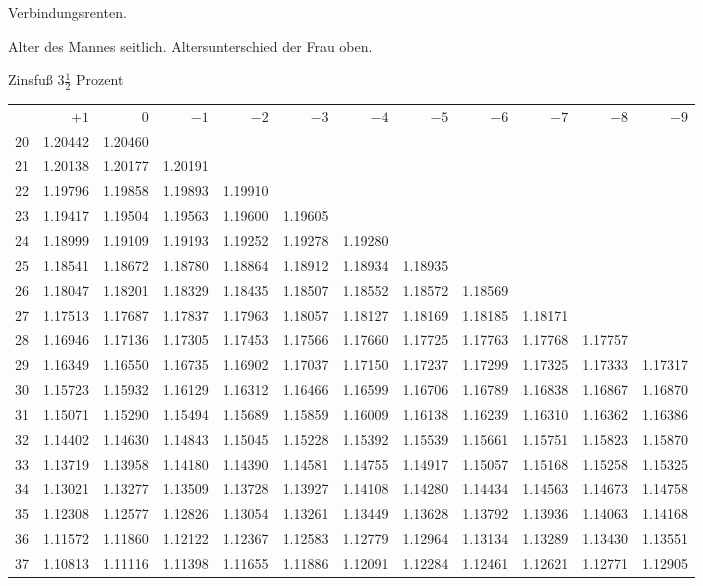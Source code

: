 \clearpage
{}
\begin{center}
Verbindungsrenten.\par\smallskip
Alter des Mannes seitlich. Altersunterschied der Frau oben.\par\smallskip
Zinsfuß \(3\tfrac{1}{2}\) Prozent\par\medskip
\fontsize{8}{10}\selectfont\setlength{\tabcolsep}{1.3pt}
\begin{tabular}{|r|rrrrrrrrrrr|}
\hline
&\(+1\)&0&\(-1\)&\(-2\)&\(-3\)&\(-4\)&\(-5\)&\(-6\)&\(-7\)&\(-8\)&\(-9\)\\[8pt]
20&1.20442&1.20460&&&&&&&&&\\
21&1.20138&1.20177&1.20191&&&&&&&&\\
22&1.19796&1.19858&1.19893&1.19910&&&&&&&\\
23&1.19417&1.19504&1.19563&1.19600&1.19605&&&&&&\\
24&1.18999&1.19109&1.19193&1.19252&1.19278&1.19280&&&&&\\[5pt]
25&1.18541&1.18672&1.18780&1.18864&1.18912&1.18934&1.18935&&&&\\
26&1.18047&1.18201&1.18329&1.18435&1.18507&1.18552&1.18572&1.18569&&&\\
27&1.17513&1.17687&1.17837&1.17963&1.18057&1.18127&1.18169&1.18185&1.18171&&\\
28&1.16946&1.17136&1.17305&1.17453&1.17566&1.17660&1.17725&1.17763&1.17768&1.17757&\\
29&1.16349&1.16550&1.16735&1.16902&1.17037&1.17150&1.17237&1.17299&1.17325&1.17333&1.17317\\[5pt]
30&1.15723&1.15932&1.16129&1.16312&1.16466&1.16599&1.16706&1.16789&1.16838&1.16867&1.16870\\
31&1.15071&1.15290&1.15494&1.15689&1.15859&1.16009&1.16138&1.16239&1.16310&1.16362&1.16386\\
32&1.14402&1.14630&1.14843&1.15045&1.15228&1.15392&1.15539&1.15661&1.15751&1.15823&1.15870\\
33&1.13719&1.13958&1.14180&1.14390&1.14581&1.14755&1.14917&1.15057&1.15168&1.15258&1.15325\\
34&1.13021&1.13277&1.13509&1.13728&1.13927&1.14108&1.14280&1.14434&1.14563&1.14673&1.14758\\[5pt]
35&1.12308&1.12577&1.12826&1.13054&1.13261&1.13449&1.13628&1.13792&1.13936&1.14063&1.14168\\
36&1.11572&1.11860&1.12122&1.12367&1.12583&1.12779&1.12964&1.13134&1.13289&1.13430&1.13551\\
37&1.10813&1.11116&1.11398&1.11655&1.11886&1.12091&1.12284&1.12461&1.12621&1.12771&1.12905\\

\end{tabular}
\end{center}

